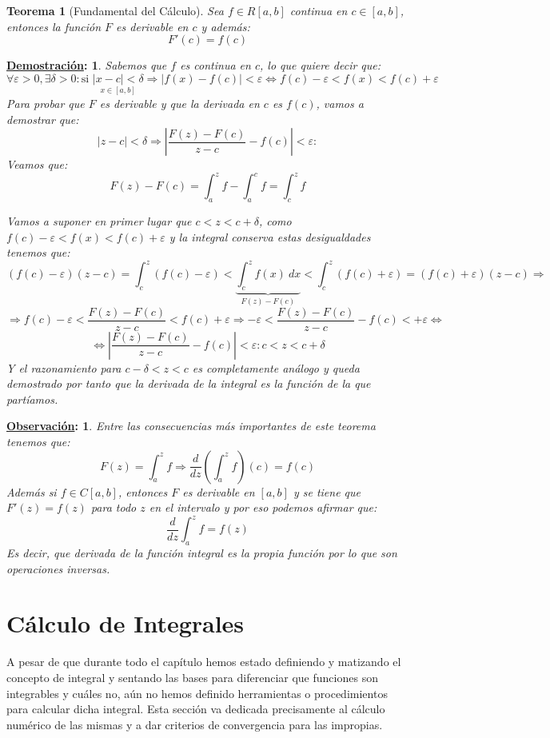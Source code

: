\documentclass[10pt,a4paper,openright]{book}
\theoremstyle{break}
\newtheorem*{theo}{Teorema}
\newtheorem*{demo}{\underline{Demostración}:}
\newtheorem*{obs}{\underline{Observación}:}
\newcommand{\dif}[1]{\ d#1}
\begin{document}
\begin{theo}[Fundamental del Cálculo]
Sea $f\in R[a,b]$ continua en $c\in [a,b]$, entonces la función $F$ es derivable en $c$ y además:
$$F'(c) = f(c)$$
\end{theo}
\begin{demo}
Sabemos que $f$ es continua en $c$, lo que quiere decir que:
$$\forall \varepsilon > 0, \exists \delta > 0: \mbox{si }  \underset {x \in [a,b]}{|x-c|<\delta} \Rightarrow |f(x) - f(c)|<\varepsilon  \Leftrightarrow
 f(c)-\varepsilon < f(x)<f(c)+ \varepsilon$$
Para probar que $F$ es derivable y que la derivada en $c$ es $f(c)$, vamos a demostrar que:
$$|z-c|<\delta \Rightarrow \left| \frac{F(z) - F(c)}{z-c} - f(c) \right| < \varepsilon: $$
Veamos que:
$$F(z) - F(c) =  \int_{a}^{z} f - \int_{a}^{c} f = \int_{c}^{z} f$$

Vamos a suponer en primer lugar que $c<z<c+\delta$, como $f(c)-\varepsilon < f(x)<f(c)+ \varepsilon$ y la integral conserva estas desigualdades tenemos que:
$$(f(c) - \varepsilon)(z-c) = \int_{c}^{z} (f(c)-\varepsilon) < \underbrace{\int_{c}^{z} f(x)\dif{x}}_{F(z) - F(c)} < \int_{c}^{z} (f(c)+\varepsilon) = (f(c) + \varepsilon)(z-c) \Rightarrow  $$
$$\Rightarrow f(c) - \varepsilon < \frac{F(z) - F(c)}{z-c} < f(c) + \varepsilon \Rightarrow - \varepsilon < \frac{F(z) - F(c)}{z-c} - f(c) < + \varepsilon \Leftrightarrow$$
$$\Leftrightarrow \left| \frac{F(z) - F(c)}{z-c} - f(c) \right| < \varepsilon: c < z < c+\delta$$
Y el razonamiento para $c-\delta < z <c$ es completamente análogo y queda demostrado por tanto que la derivada de la integral es la función de la que partíamos.
\end{demo}

\begin{obs}
Entre las consecuencias más importantes de este teorema tenemos que:
$$F(z) = \int_{a}^{z} f\Rightarrow \frac{d}{dz}\left(\int_{a}^{z} f\right) (c) = f(c)$$
Además si $f\in C[a,b]$, entonces $F$ es derivable en $[a,b]$ y se tiene que $F'(z) = f(z)$ para todo $z$ en el intervalo y por eso podemos afirmar que:
$$\frac{d}{dz} \int_{a}^{z} f = f(z)$$
Es decir, que derivada de la función integral es la propia función por lo que son operaciones inversas.
\end{obs}

\section{Cálculo de Integrales}
A pesar de que durante todo el capítulo hemos estado definiendo y matizando el concepto de integral y sentando las bases para diferenciar que funciones son integrables y cuáles no, aún no hemos definido herramientas o procedimientos para calcular dicha integral. Esta sección va dedicada precisamente al cálculo numérico de las mismas y a dar criterios de convergencia para las impropias. 
\end{document}
